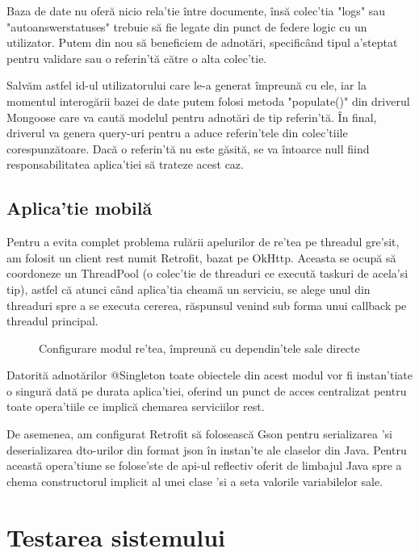 Baza de date nu oferă nicio rela'tie între documente, însă colec'tia "logs" sau "autoanswerstatuses" trebuie să fie legate din punct de federe logic cu un utilizator. Putem din nou să beneficiem de adnotări, specificând tipul a'steptat pentru validare sau o referin'tă către o alta colec'tie.

Salvăm astfel id-ul utilizatorului care le-a generat împreună cu ele, iar la momentul interogării bazei de date putem folosi metoda "populate()" din driverul Mongoose care va caută modelul pentru adnotări de tip referin'tă. În final, driverul va genera query-uri pentru a aduce referin'tele din colec'tiile corespunzătoare. Dacă o referin'tă nu este găsită, se va întoarce null fiind responsabilitatea aplica'tiei să trateze acest caz. 

\subsection {Aplica'tie mobilă}

Pentru a evita complet problema rulării apelurilor de re'tea pe threadul gre'sit, am folosit un client \acrshort{rest} numit Retrofit, bazat pe OkHttp. Aceasta se ocupă să coordoneze un ThreadPool (o colec'tie de threaduri ce execută taskuri de acela'si tip), astfel că atunci când aplica'tia cheamă un serviciu, se alege unul din threaduri spre a se executa cererea, răspunsul venind sub forma unui callback pe threadul principal.

\begin{figure}[H]
  \centering
  \caption{Configurare modul re'tea, împreună cu dependin'tele sale directe}
\end{figure}

Datorită adnotărilor @Singleton toate obiectele din acest modul vor fi instan'tiate o singură dată pe durata aplica'tiei, oferind un punct de acces centralizat pentru toate opera'tiile ce implică chemarea serviciilor \acrshort{rest}.

De asemenea, am configurat Retrofit să folosească Gson pentru serializarea 'si deserializarea \acrshort{dto}-urilor din format \acrshort{json} în instan'te ale claselor din Java. Pentru această opera'tiune se folose'ste de \acrshort{api}-ul reflectiv oferit de limbajul Java spre a chema constructorul implicit al unei clase 'si a seta valorile variabilelor sale.

\section {Testarea sistemului}

